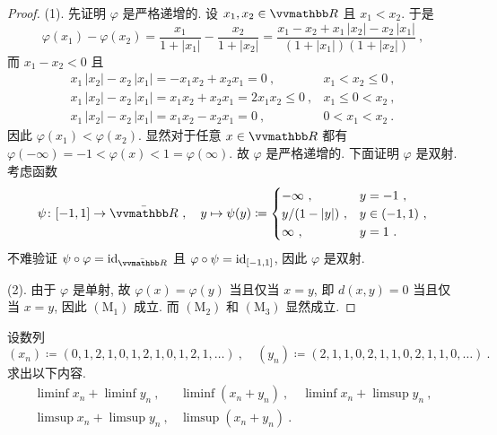 \begin{proof}
    (1). 先证明 \(\varphi\) 是严格递增的. 设 \(x_1, x_2 \in \R\) 且 \(x_1 < x_2\). 于是
    \[
        \varphi(x_1) - \varphi(x_2) = \frac{x_1}{1 + |x_1|} - \frac{x_2}{1 + |x_2|} = \frac{x_1 - x_2 + x_1\, |x_2| - x_2\, |x_1|}{(1 + |x_1|) (1 + |x_2|)}\ ,
    \]
    而 \(x_1 - x_2 < 0\) 且
    \[
        \begin{array}{ll}
            x_1\, |x_2| - x_2\, |x_1| = - x_1 x_2 + x_2 x_1 = 0\ , & x_1 < x_2 \leq 0\ , \\
            x_1\, |x_2| - x_2\, |x_1| = x_1 x_2 + x_2 x_1 = 2 x_1 x_2 \leq 0\ , & x_1 \leq 0 < x_2\ , \\
            x_1\, |x_2| - x_2\, |x_1| = x_1 x_2 - x_2 x_1 = 0\ , & 0 < x_1 < x_2\ .
        \end{array}
    \]
    因此 \(\varphi(x_1) < \varphi(x_2)\). 显然对于任意 \(x \in \R\) 都有 \(\varphi(- \infty) = - 1 < \varphi(x) < 1 = \varphi(\infty)\). 故 \(\varphi\) 是严格递增的. 下面证明 \(\varphi\) 是双射. 考虑函数
    \[
        \psi \colon [- 1, 1] \to \bar \R\ ,\quad y \mapsto \psi(y) \coloneqq
        \begin{cases}
            - \infty\ ,      & y = - 1\ , \\
            y / (1 - |y|)\ , & y \in (- 1, 1)\ , \\
            \infty\ ,        & y = 1\ .
        \end{cases}
    \]
    不难验证 \(\psi \circ \varphi = \id_{\bar \R}\) 且 \(\varphi \circ \psi = \operatorname{id}_{[- 1, 1]}\), 因此 \(\varphi\) 是双射.

    (2). 由于 \(\varphi\) 是单射, 故 \(\varphi(x) = \varphi(y)\) 当且仅当 \(x = y\), 即 \(d(x, y) = 0\) 当且仅当 \(x = y\), 因此 \((\mathrm M_1)\) 成立. 而 \((\mathrm M_2)\) 和 \((\mathrm M_3)\) 显然成立.
\end{proof}

\begin{exercise}
    设数列
    \[
        (x_n) \coloneqq (0, 1, 2, 1, 0, 1, 2, 1, 0, 1, 2, 1, \ldots)\ ,\quad (y_n) \coloneqq (2, 1, 1, 0, 2, 1, 1, 0, 2, 1, 1, 0, \ldots)\ .
    \]
    求出以下内容.
    \[
        \begin{array}{lll}
            \liminf x_n + \liminf y_n\ , & \liminf (x_n + y_n)\ , & \liminf x_n + \limsup y_n\ ,\\
            \limsup x_n + \limsup y_n\ , & \limsup (x_n + y_n)\ . &
        \end{array}
    \]
\end{exercise}

